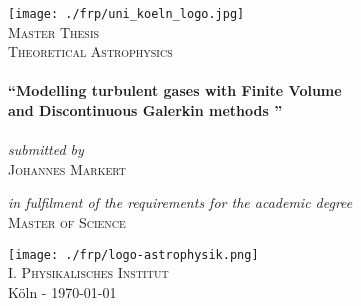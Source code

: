\newcommand{\expNr}{04}
\newcommand{\expTitle}{}
\newcommand{\releaseDate}{\today}

\begin{titlepage}
\begin{center}

\texttt{[image: ./frp/uni\_koeln\_logo.jpg]}\\[1.0cm]  

\textsc{\LARGE Master Thesis}
\textsc{\Large }\\[0.8cm]
\textsc{\Large Theoretical Astrophysics}\\[0.5cm]

\HRule\\[0.7cm]
{ \LARGE \bfseries \textquotedblleft Modelling turbulent gases with Finite Volume \\[0.4cm] and Discontinuous Galerkin methods \textquotedblright}\\[0.4cm]
\HRule \\[0.7cm]

\vspace{1cm}
\large \emph{submitted by}\\[0.4cm]
\textsc{\LARGE Johannes Markert}\\[1cm]
\vspace{0.2cm}

\large \emph{in fulfilment of the requirements for the academic degree}\\[0.4cm]
\textsc{\LARGE Master of Science}
\vspace{2.0cm}

\texttt{[image: ./frp/logo-astrophysik.png]}\\
\textsc{\large I. Physikalisches Institut}\\[1cm]

\vfill
K\"oln - \releaseDate 

\end{center}
\end{titlepage}


\cleardoubleemptypage
